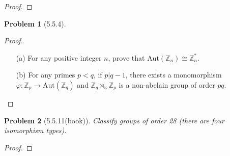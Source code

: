 \documentclass[10pt]{article}
\newcommand{\sk}{\vskip 10mm}
\newcommand{\bb}[1]{\mathbb{#1}}
\theoremstyle{plain}
\newtheorem{problem}{Problem}
\theoremstyle{remark}
\begin{document}
\begin{proof}
  
\end{proof}

\sk

\begin{problem}[5.5.4]
  
\end{problem}

\begin{proof}
  \begin{enumerate}
  \item[(a)] For any positive integer $n$, prove that $\text{Aut}(\bb{Z}_n)\cong \bb{Z}_n^*$.
  \item[(b)] For any primes $p<q$, if $p|q-1$, there exists a monomorphism
    $\varphi:\bb{Z}_p\rightarrow \text{Aut}(\bb{Z}_q)$ and $\bb{Z}_q\rtimes_\varphi \bb{Z}_p$ is a non-abelain
    group of order $pq$.
  \end{enumerate}
\end{proof}

\sk

\begin{problem}[5.5.11(book)]
  Classify groups of order 28 (there are four isomorphism types).
\end{problem}

\begin{proof}
  
\end{proof}

\sk

\end{document}
